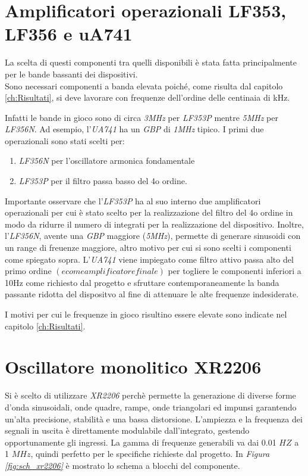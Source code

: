\documentclass[titlepage]{report}
\begin{document}
	
\section{Amplificatori operazionali LF353, LF356 e uA741}
\label{sec:OpAmp}
	La scelta di questi componenti tra quelli disponibili è stata fatta principalmente per le bande bassanti dei dispositivi.
	\\ Sono necessari componenti a banda elevata poiché, come risulta dal capitolo \ref{ch:Risultati}, si deve lavorare con frequenze dell'ordine delle centinaia di kHz.
	
	 \noindent Infatti le bande in gioco sono di circa \textit{3MHz} per \textit{LF353P} mentre \textit{5MHz} per \textit{LF356N}. Ad esempio, l'\textit{UA741} ha un \textit{GBP} di \textit{1MHz} tipico. I primi due operazionali sono stati scelti per:
	
	\begin{enumerate}
		\item \textit{LF356N} per l'oscillatore armonica fondamentale 
		\item \textit{LF353P} per il filtro passa basso del 4o ordine. 
	\end{enumerate}
	
	
	\noindent Importante osservare che l'\textit{LF353P} ha al suo interno due amplificatori operazionali per cui è stato scelto per la realizzazione del filtro del 4o ordine in modo da ridurre il numero di integrati per la realizzazione del dispositivo. Inoltre, l'\textit{LF356N}, avente una \textit{GBP} maggiore (\textit{5MHz}), permette di generare sinusoidi con un range di freuenze maggiore, altro motivo per cui si sono scelti i componenti come spiegato sopra.
	L'\textit{UA741} viene impiegato come filtro attivo passa alto del primo ordine $(e come amplificatore finale)$ per togliere le componenti inferiori a 10Hz come richiesto dal progetto e sfruttare contemporaneamente la banda passante ridotta del dispositvo al fine di attenuare le alte frequenze indesiderate.

	\noindent I motivi per cui le frequenze in gioco risultino essere elevate sono indicate nel capitolo \ref{ch:Risultati}.

	
\section{Oscillatore monolitico XR2206}
	\label{sec:XR2206}
	
	Si è scelto di utilizzare \textit{XR2206} perchè permette la generazione di diverse forme d'onda sinusoidali, onde quadre, rampe, onde triangolari ed impunsi garantendo un'alta precisione, stabilità e una bassa distorsione. L'ampiezza e la frequenza dei segnali in uscita è direttamente modulabile dall'integrato, gestendo opportunamente gli ingressi. La gamma di frequenze generabili va dai 0.01 $HZ$ a 1 $MHz$, quindi perfetto per le specifiche richieste dal progetto. 
	In \textit{Figura \ref{fig:sch_xr2206}} è mostrato lo schema a blocchi del componente.
	
\end{document}
